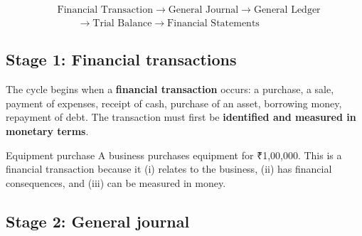\documentclass[11pt,a4paper]{article}
\newcommand{\Rs}{{\rsfont ₹}}
\begin{document}
\[
\boxed{\begin{aligned}&\text{Financial Transaction}\rightarrow\text{General Journal}\rightarrow\text{General Ledger}\\&\qquad\rightarrow\text{Trial Balance}\rightarrow\text{Financial Statements}\end{aligned}}
\]

\begin{center}
\end{center}

\subsection{Stage 1: Financial transactions}

The cycle begins when a \textbf{financial transaction} occurs: a purchase, a sale, payment of
expenses, receipt of cash, purchase of an asset, borrowing money, repayment of debt. The
transaction must first be \textbf{identified and measured in monetary terms}.

\begin{exbox}{Equipment purchase}
A business purchases equipment for \Rs 1,00,000. This is a financial transaction because it
(i) relates to the business, (ii) has financial consequences, and (iii) can be measured in money.
\end{exbox}

\subsection{Stage 2: General journal}
\end{document}
